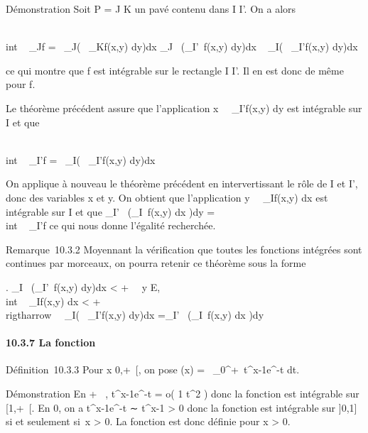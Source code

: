 \documentclass[]{article}
\begin{document}
Démonstration Soit P = J \times K un pavé contenu dans I \times I'. On a alors

\int  \\int ~
\_J\timesK\textbar{}f\textbar{} =\int ~
\_J\left (\int ~
\_K\textbar{}f(x,y)\textbar{} dy\right )dx
\leq\int  \_J~\left
(\int  \_I'~\textbar{}f(x,y)\textbar{}
dy\right )dx \leq\int ~
\_I\left (\int ~
\_I'\textbar{}f(x,y)\textbar{} dy\right )dx

ce qui montre que \textbar{}f\textbar{} est intégrable sur le rectangle
I \times I'. Il en est donc de même pour f.

Le théorème précédent assure que l'application
x\mapsto~\int ~
\_I'f(x,y) dy est intégrable sur I et que

\int  \\int ~
\_I\timesI'f =\int ~
\_I\left (\int ~
\_I'f(x,y) dy\right )dx

On applique à nouveau le théorème précédent en intervertissant le rôle
de I et I', donc des variables x et y. On obtient que l'application
y\mapsto~\int ~
\_If(x,y) dx est intégrable sur I et que
\int  \_I'~\left
(\int  \_I~f(x,y) dx\right
)dy =\int  \\int ~
\_I\timesI'f ce qui nous donne l'égalité recherchée.

Remarque~10.3.2 Moyennant la vérification que toutes les fonctions
intégrées sont continues par morceaux, on pourra retenir ce théorème
sous la forme

\left .\array
\int  \_I~\left
(\int  \_I'~\textbar{}f(x,y)\textbar{}
dy\right )dx \textless{} +\infty~ \cr
\forall~y \in E, \\int ~
\_I\textbar{}f(x,y)\textbar{} dx \textless{} +\infty~ 
\right \\rigtharrow~\int ~
\_I\left (\int ~
\_I'f(x,y) dy\right )dx
=\int  \_I'~\left
(\int  \_I~f(x,y) dx\right
)dy

\paragraph{10.3.7 La fonction \Gamma}

Définition~10.3.3 Pour x \in{]}0,+\infty~{[}, on pose \Gamma(x)
=\int ~
\_0^+\infty~t^x-1e^-t dt.

Démonstration En + \infty~, t^x-1e^-t = o( 1
\over t^2 ) donc la fonction est intégrable
sur {[}1,+\infty~{[}. En 0, on a t^x-1e^-t ∼
t^x-1 \textgreater{} 0 donc la fonction est intégrable sur
{]}0,1{]} si et seulement si~x \textgreater{} 0. La fonction \Gamma est donc
définie pour x \textgreater{} 0.
\end{document}
